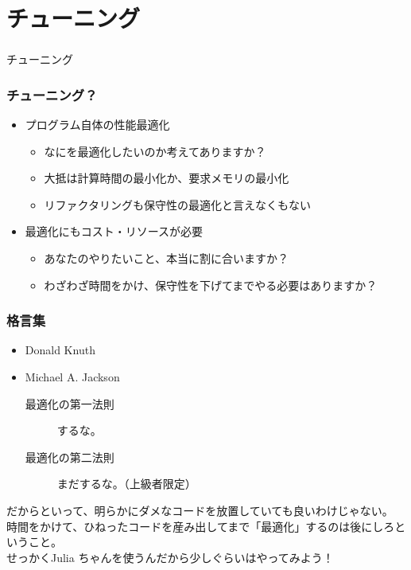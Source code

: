 \section{チューニング}

\begin{frame}
  \frametitle{}
  {\Huge チューニング}
\end{frame}

\begin{frame}
\frametitle{チューニング？}
\begin{itemize}
  \item プログラム自体の性能最適化
  \begin{itemize}
    \item なにを最適化したいのか考えてありますか？
    \item 大抵は計算時間の最小化か、要求メモリの最小化
    \item リファクタリングも保守性の最適化と言えなくもない
  \end{itemize}
  \item 最適化にもコスト・リソースが必要
  \begin{itemize}
    \item あなたのやりたいこと、本当に割に合いますか？
    \item わざわざ時間をかけ、保守性を下げてまでやる必要はありますか？
  \end{itemize}
\end{itemize}
\end{frame}

\begin{frame}
\frametitle{格言集}
{\Large
\begin{itemize}
  \item Donald Knuth
  \item Michael A. Jackson
  \begin{description}
    \item [最適化の第一法則]  するな。 \onslide
    \item [最適化の第二法則]  まだするな。（上級者限定） \onslide
  \end{description}
\end{itemize}
}
 だからといって、明らかにダメなコードを放置していても良いわけじゃない。\\
時間をかけて、ひねったコードを産み出してまで「最適化」するのは後にしろということ。\\
 せっかくJulia ちゃんを使うんだから少しぐらいはやってみよう！
\end{frame}

